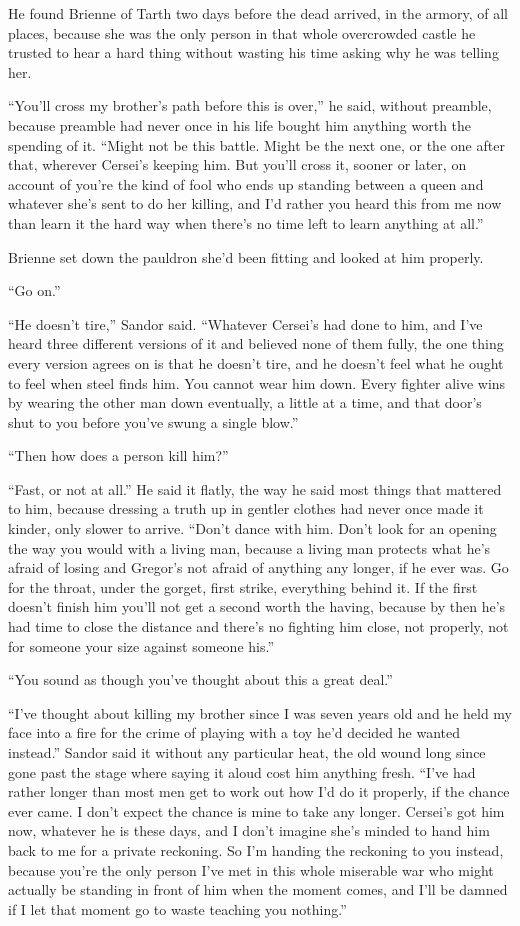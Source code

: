 He found Brienne of Tarth two days before the dead arrived, in the armory, of all places, because she was the only person in that whole overcrowded castle he trusted to hear a hard thing without wasting his time asking why he was telling her.

“You’ll cross my brother’s path before this is over,” he said, without preamble, because preamble had never once in his life bought him anything worth the spending of it. “Might not be this battle. Might be the next one, or the one after that, wherever Cersei’s keeping him. But you’ll cross it, sooner or later, on account of you’re the kind of fool who ends up standing between a queen and whatever she’s sent to do her killing, and I’d rather you heard this from me now than learn it the hard way when there’s no time left to learn anything at all.”

Brienne set down the pauldron she’d been fitting and looked at him properly.

“Go on.”

\sceneBreak

“He doesn’t tire,” Sandor said. “Whatever Cersei’s had done to him, and I’ve heard three different versions of it and believed none of them fully, the one thing every version agrees on is that he doesn’t tire, and he doesn’t feel what he ought to feel when steel finds him. You cannot wear him down. Every fighter alive wins by wearing the other man down eventually, a little at a time, and that door’s shut to you before you’ve swung a single blow.”

“Then how does a person kill him?”

“Fast, or not at all.” He said it flatly, the way he said most things that mattered to him, because dressing a truth up in gentler clothes had never once made it kinder, only slower to arrive. “Don’t dance with him. Don’t look for an opening the way you would with a living man, because a living man protects what he’s afraid of losing and Gregor’s not afraid of anything any longer, if he ever was. Go for the throat, under the gorget, first strike, everything behind it. If the first doesn’t finish him you’ll not get a second worth the having, because by then he’s had time to close the distance and there’s no fighting him close, not properly, not for someone your size against someone his.”

“You sound as though you’ve thought about this a great deal.”

“I’ve thought about killing my brother since I was seven years old and he held my face into a fire for the crime of playing with a toy he’d decided he wanted instead.” Sandor said it without any particular heat, the old wound long since gone past the stage where saying it aloud cost him anything fresh. “I’ve had rather longer than most men get to work out how I’d do it properly, if the chance ever came. I don’t expect the chance is mine to take any longer. Cersei’s got him now, whatever he is these days, and I don’t imagine she’s minded to hand him back to me for a private reckoning. So I’m handing the reckoning to you instead, because you’re the only person I’ve met in this whole miserable war who might actually be standing in front of him when the moment comes, and I’ll be damned if I let that moment go to waste teaching you nothing.”

